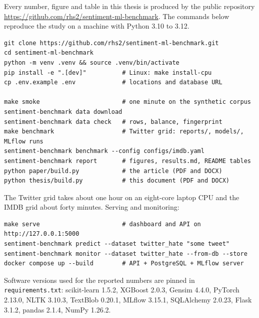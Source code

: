 Every number, figure and table in this thesis is produced by the public repository \url{https://github.com/rhs2/sentiment-ml-benchmark}. The commands below reproduce the study on a machine with Python 3.10 to 3.12.

\begin{verbatim}
git clone https://github.com/rhs2/sentiment-ml-benchmark.git
cd sentiment-ml-benchmark
python -m venv .venv && source .venv/bin/activate
pip install -e ".[dev]"          # Linux: make install-cpu
cp .env.example .env             # locations and database URL

make smoke                       # one minute on the synthetic corpus
sentiment-benchmark data download
sentiment-benchmark data check   # rows, balance, fingerprint
make benchmark                   # Twitter grid: reports/, models/, MLflow runs
sentiment-benchmark benchmark --config configs/imdb.yaml
sentiment-benchmark report       # figures, results.md, README tables
python paper/build.py            # the article (PDF and DOCX)
python thesis/build.py           # this document (PDF and DOCX)
\end{verbatim}

\noindent The Twitter grid takes about one hour on an eight-core laptop CPU and the IMDB grid about forty minutes. Serving and monitoring:

\begin{verbatim}
make serve                       # dashboard and API on http://127.0.0.1:5000
sentiment-benchmark predict --dataset twitter_hate "some tweet"
sentiment-benchmark monitor --dataset twitter_hate --from-db --store
docker compose up --build        # API + PostgreSQL + MLflow server
\end{verbatim}

\noindent Software versions used for the reported numbers are pinned in \texttt{requirements.txt}: scikit-learn 1.5.2, XGBoost 2.0.3, Gensim 4.4.0, PyTorch 2.13.0, NLTK 3.10.3, TextBlob 0.20.1, MLflow 3.15.1, SQLAlchemy 2.0.23, Flask 3.1.2, pandas 2.1.4, NumPy 1.26.2.
